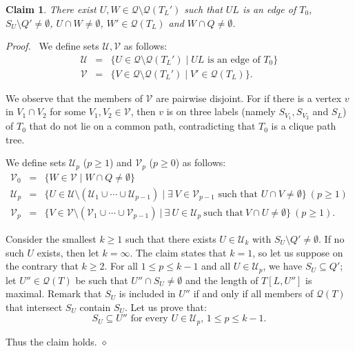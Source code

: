 \documentclass[11pt]{article}
\newtheorem{claim}{Claim}
\newenvironment{proofcl}{\noindent \emph{Proof.}\ }{Thus the claim
holds.  \hfill $\diamond$\vspace{1em}}
\begin{document}
\begin{claim}
\label{claim:p}
There exist $U, W\in \mathcal Q\setminus \mathcal Q(T_L')$ such that
$UL$ is an edge of $T_0$, $S_U\setminus Q'\neq \emptyset$, $U\cap
W\neq\emptyset$, $W' \in \mathcal Q(T_L)$ and $W\cap Q \neq\emptyset$.
\end{claim}
\begin{proofcl}
We define sets $\mathcal U, \mathcal V$ as follows:
\begin{eqnarray*}
\mathcal U &=& \{U\in\mathcal Q\setminus \mathcal Q(T_L') \mid UL
\textrm{ is an edge of } T_0\}\\
\mathcal V &=& \{V\in\mathcal Q\setminus \mathcal Q(T_L') \mid V' \in
\mathcal Q(T_L)\}.
\end{eqnarray*}

We observe that the members of $\mathcal V$ are pairwise disjoint.
For if there is a vertex $v$ in $V_1\cap V_2$ for some $V_1, V_2
\in\mathcal V$, then $v$ is on three labels (namely $S_{V_1}, S_{V_2}$
and $S_L$) of $T_0$ that do not lie on a common path, contradicting
that $T_0$ is a clique path tree.

We define sets $\mathcal U_p$ ($p \geq 1$) and $\mathcal V_p$ ($p\geq
0$) as follows:
\begin{eqnarray*}
\mathcal V_0 &=& \{W\in\mathcal V \mid W\cap Q \neq\emptyset\}\\
\mathcal U_p &=& \{U\in\mathcal U\setminus (\mathcal
U_1\cup\cdots\cup\mathcal U_{p-1}) \mid \exists\ V\in \mathcal
V_{p-1} \textrm{ such that } U\cap V \neq \emptyset \}\ (p \geq 1)\\
\mathcal V_p &=& \{V\in\mathcal V\setminus (\mathcal
V_1\cup\cdots\cup\mathcal V_{p-1})\ |\ \exists\ U\in \mathcal U_p\
\textrm{such that}\ V\cap U \neq \emptyset \}\ (p \geq 1).
\end{eqnarray*}

Consider the smallest $k\geq 1$ such that there exists $U\in \mathcal
U_k$ with $S_U\setminus Q'\neq \emptyset$.  If no such $U$ exists,
then let $k=\infty$.  The claim states that $k=1$, so let us suppose
on the contrary that $k\ge 2$.  For all $1\leq p\leq k-1$ and all
$U\in \mathcal U_p$, we have $S_U \subseteq Q'$; let $U''\in\mathcal
Q(T)$ be such that $U''\cap S_U\neq \emptyset$ and the length of $T[L,
U'']$ is maximal.  Remark that $S_U$ is included in $U''$ if and only
if all members of $\mathcal Q(T)$ that intersect $S_U$ contain $S_U$.
Let us prove that:
\begin{equation}\label{u2nde}
\mbox{$S_U\subseteq U''$ for every $U\in \mathcal U_p$, $1\leq p\leq
k-1$.}
\end{equation}


\end{proofcl}
\end{document}
